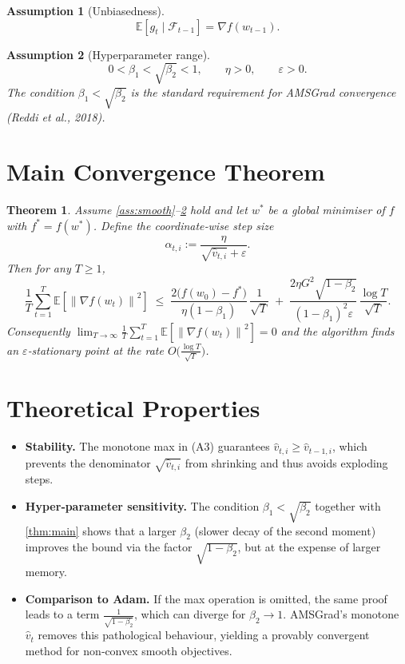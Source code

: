 \documentclass{article}
\newtheorem{theorem}{Theorem}
\newtheorem{assumption}{Assumption}
\newcommand{\E}{\mathbb{E}}
\newcommand{\norm}[1]{\left\lVert#1\right\rVert}
\begin{document}
\begin{assumption}[Unbiasedness]\label{ass:unbiased}
\[
\mathbb{E}[g_t\mid\mathcal{F}_{t-1}]=\nabla f(w_{t-1}) .
\]
\end{assumption}

\begin{assumption}[Hyperparameter range]\label{ass:hyper}
\[
0<\beta_1<\sqrt{\beta_2}<1,\qquad \eta>0,\qquad \varepsilon>0 .
\]
The condition $\beta_1<\sqrt{\beta_2}$ is the standard requirement for AMSGrad convergence (Reddi et al., 2018).
\end{assumption}

\section*{Main Convergence Theorem}
\begin{theorem}\label{thm:main}
Assume \ref{ass:smooth}–\ref{ass:hyper} hold and let $w^*$ be a global minimiser of $f$ with $f^*=f(w^*)$.  
Define the coordinate‑wise step size
\[
\alpha_{t,i}:=\frac{\eta}{\sqrt{\hat v_{t,i}}+\varepsilon}.
\]
Then for any $T\ge 1$,
\[
\frac{1}{T}\sum_{t=1}^{T}\E\!\left[\norm{\nabla f(w_{t})}^2\right]
\;\le\;
\frac{2\big(f(w_0)-f^*\big)}{ \eta(1-\beta_1)}\,
\frac{1}{\sqrt{T}}
\;+\;
\frac{2\eta G^2\sqrt{1-\beta_2}}{(1-\beta_1)^2\varepsilon}\,
\frac{\log T}{\sqrt{T}} .
\]
Consequently $\displaystyle\lim_{T\to\infty}\frac{1}{T}\sum_{t=1}^{T}\E[\norm{\nabla f(w_t)}^2]=0$ and the algorithm finds an $\varepsilon$‑stationary point at the rate $O\!\big(\frac{\log T}{\sqrt{T}}\big)$.
\end{theorem}

\section*{Theoretical Properties}
\begin{itemize}
\item \textbf{Stability.} The monotone max in (A3) guarantees $\hat v_{t,i}\ge \hat v_{t-1,i}$, which prevents the denominator $\sqrt{\hat v_{t,i}}$ from shrinking and thus avoids exploding steps.
\item \textbf{Hyper‑parameter sensitivity.} The condition $\beta_1<\sqrt{\beta_2}$ together with \eqref{thm:main} shows that a larger $\beta_2$ (slower decay of the second moment) improves the bound via the factor $\sqrt{1-\beta_2}$, but at the expense of larger memory.
\item \textbf{Comparison to Adam.} If the max operation is omitted, the same proof leads to a term $\frac{1}{\sqrt{1-\beta_2}}$, which can diverge for $\beta_2\to1$. AMSGrad’s monotone $\hat v_t$ removes this pathological behaviour, yielding a provably convergent method for non‑convex smooth objectives.
\end{itemize}
\end{document}
